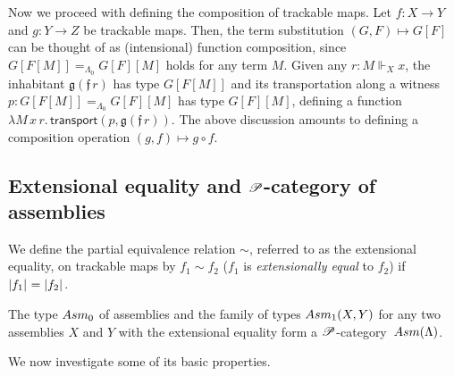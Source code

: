 \documentclass[a4paper,UKenglish,numberwithinsect,cleveref,thm-restate,draft]{lipics-v2021}
\numberwithin{equation}{section}
\theoremstyle{definition}
\theoremstyle{plain}
\begin{document}
Now we proceed with defining the composition of trackable maps. Let $f\colon X \to Y$ and $g\colon Y \to Z$ be trackable maps.
Then, the term substitution $(G, F) \mapsto G [ F ]$ can be thought of as (intensional) function composition, since $G[F[M]] =_{\Lambda_0} G[F] [M]$ holds for any term $M$.
Given any $r : M \Vdash_X x$, the inhabitant $\mathfrak{g}(\mathfrak{f}\,r)$ has type $G[F[M]]$ and its transportation along a witness $p : G[F[M]] =_{\Lambda_0} G[F][M]$ has type $G[F][M]$, defining a function $\lambda M\,x\,r.\, \mathsf{transport}(p, \mathfrak{g}(\mathfrak{f}\,r))$.
The above discussion amounts to defining a composition operation $(g, f) \mapsto g \circ f$.




\subsection{Extensional equality and \texorpdfstring{$\mathscr{P}$}{P}-category of assemblies}

We define the partial equivalence relation $\sim$, referred to as the extensional equality, on trackable maps by $f_1 \sim f_2$ ($f_1$ is \emph{extensionally equal} to $f_2$) if $\mathopen{}\left|f_1\right|_{}^{}\mathclose{} = \mathopen{}\left|f_2\right|_{}^{}\mathclose{}$.
\begin{proposition}
  The type $\Asm_0$ of assemblies and the family of types $\Asm_1(X, Y)$ for any two assemblies $X$ and $Y$ with the extensional equality form a $\mathscr{P}$-category~$\Asm(\Lambda)$.
\end{proposition}

We now investigate some of its basic properties.
\end{document}
